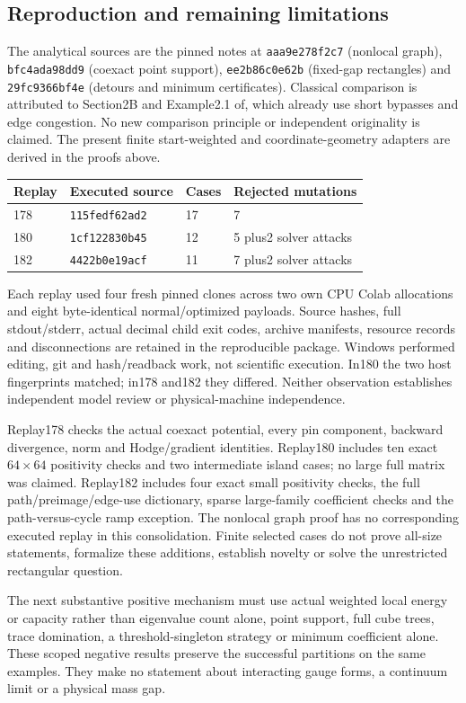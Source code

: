 \subsection{Reproduction and remaining limitations}
The analytical sources are the pinned notes at
\texttt{aaa9e278f2c7} (nonlocal graph), \texttt{bfc4ada98dd9} (coexact
point support), \texttt{ee2b86c0e62b} (fixed-gap rectangles) and
\texttt{29fc9366bf4e} (detours and minimum certificates).
Classical comparison is attributed to Section2B and Example2.1
of\cite{geo:comparison}, which already use short bypasses and edge
congestion. No new comparison principle or independent originality is
claimed. The present finite start-weighted and coordinate-geometry
adapters are derived in the proofs above.

\begin{center}\small
\begin{tabular}{llll}
\toprule
Replay & Executed source & Cases & Rejected mutations\\
\midrule
178 & \texttt{115fedf62ad2} & 17 & 7\\
180 & \texttt{1cf122830b45} & 12 & 5 plus2 solver attacks\\
182 & \texttt{4422b0e19acf} & 11 & 7 plus2 solver attacks\\
\bottomrule
\end{tabular}
\end{center}
Each replay used four fresh pinned clones across two own CPU Colab
allocations and eight byte-identical normal/optimized payloads. Source
hashes, full stdout/stderr, actual decimal child exit codes, archive
manifests, resource records and disconnections are retained in the
reproducible package. Windows performed editing, git and hash/readback
work, not scientific execution. In180 the two host fingerprints matched;
in178 and182 they differed. Neither observation establishes independent
model review or physical-machine independence.

Replay178 checks the actual coexact potential, every pin component,
backward divergence, norm and Hodge/gradient identities. Replay180
includes ten exact $64\times64$ positivity checks and two intermediate
island cases; no large full matrix was claimed. Replay182 includes four
exact small positivity checks, the full path/preimage/edge-use dictionary,
sparse large-family coefficient checks and the path-versus-cycle ramp
exception. The nonlocal graph proof has no corresponding executed replay
in this consolidation. Finite selected cases do not prove all-size
statements, formalize these additions, establish novelty or solve the
unrestricted rectangular question.

The next substantive positive mechanism must use actual weighted local
energy or capacity rather than eigenvalue count alone, point support,
full cube trees, trace domination, a threshold-singleton strategy or
minimum coefficient alone. These scoped negative results preserve the
successful partitions on the same examples. They make no statement about
interacting gauge forms, a continuum limit or a physical mass gap.